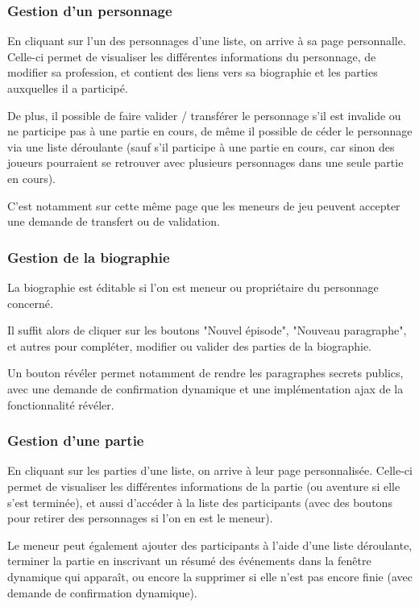 \documentclass[a4paper, 11pt, titlepage]{article}
\begin{document}
\subsubsection {Gestion d'un personnage}

En cliquant sur l'un des personnages d'une liste, on arrive à sa page personnalle. Celle-ci permet de visualiser les différentes informations du personnage, de modifier sa profession, et contient des liens vers sa biographie et les parties auxquelles il a participé.

De plus, il possible de faire valider / transférer le personnage s'il est invalide ou ne participe pas à une partie en cours, de même il possible de céder le personnage via une liste déroulante (sauf s'il participe à une partie en cours, car sinon des joueurs pourraient se retrouver avec plusieurs personnages dans une seule partie en cours).

C'est notamment sur cette même page que les meneurs de jeu peuvent accepter une demande de transfert ou de validation.


\subsubsection {Gestion de la biographie}

La biographie est éditable si l'on est meneur ou propriétaire du personnage concerné.

Il suffit alors de cliquer sur les boutons "Nouvel épisode", "Nouveau paragraphe", et autres pour compléter, modifier ou valider des parties de la biographie.

Un bouton révéler permet notamment de rendre les paragraphes secrets publics, avec une demande de confirmation dynamique et une implémentation {\sc ajax} de la fonctionnalité révéler.


\subsubsection {Gestion d'une partie}

En cliquant sur les parties d'une liste, on arrive à leur page personnalisée. Celle-ci permet de visualiser les différentes informations de la partie (ou aventure si elle s'est terminée), et aussi d'accéder à la liste des participants (avec des boutons pour retirer des personnages si l'on en est le meneur).

Le meneur peut également ajouter des participants à l'aide d'une liste déroulante, terminer la partie en inscrivant un résumé des événements dans la fenêtre dynamique qui apparaît, ou encore la supprimer si elle n'est pas encore finie (avec demande de confirmation dynamique).
\end{document}
